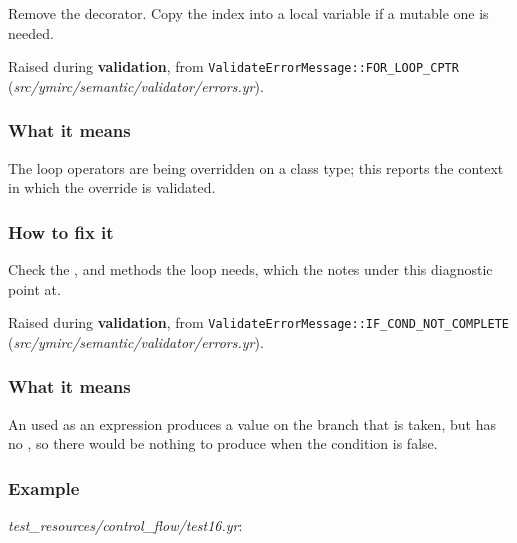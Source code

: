 Remove the decorator. Copy the index into a local variable if a mutable one is needed.

\label{sec:codes:e4072}

Raised during \textbf{validation}, from \texttt{ValidateErrorMessage::\allowbreak{}FOR\_\allowbreak{}LOOP\_\allowbreak{}CPTR} (\textit{src/\allowbreak{}ymirc/\allowbreak{}semantic/\allowbreak{}validator/\allowbreak{}errors.yr}).

\subsubsection*{What it means}

The  loop operators are being overridden on a class type; this reports the context in which the override is validated.

\subsubsection*{How to fix it}

Check the ,  and  methods the loop needs, which the notes under this diagnostic point at.

\label{sec:codes:e4081}

Raised during \textbf{validation}, from \texttt{ValidateErrorMessage::\allowbreak{}IF\_\allowbreak{}COND\_\allowbreak{}NOT\_\allowbreak{}COMPLETE} (\textit{src/\allowbreak{}ymirc/\allowbreak{}semantic/\allowbreak{}validator/\allowbreak{}errors.yr}).

\subsubsection*{What it means}

An  used as an expression produces a value on the branch that is taken, but has no , so there would be nothing to produce when the condition is false.

\subsubsection*{Example}

\textit{test\_\allowbreak{}resources/\allowbreak{}control\_\allowbreak{}flow/\allowbreak{}test16.yr}:

